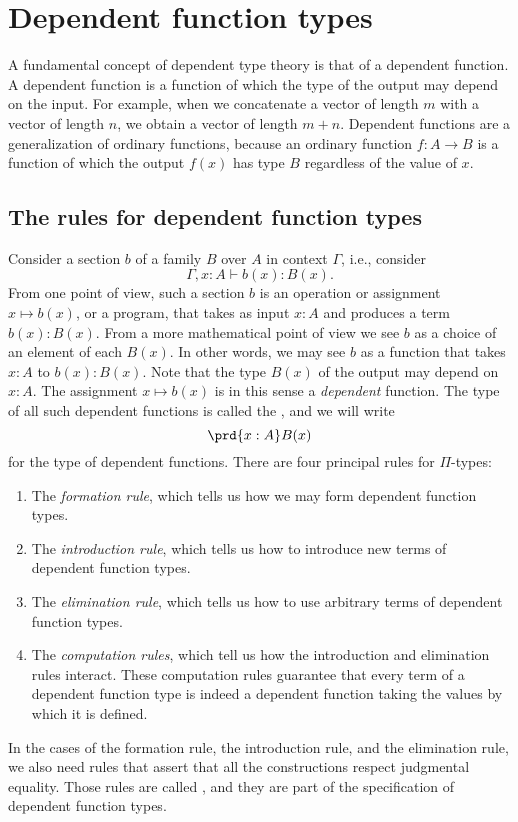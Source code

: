 \section{Dependent function types}
\label{sec:pi}

A fundamental concept of dependent type theory is that of a dependent function. A dependent function is a function of which the type of the output may depend on the input. For example, when we concatenate a vector of length $m$ with a vector of length $n$, we obtain a vector of length $m+n$. Dependent functions are a generalization of ordinary functions, because an ordinary function $f:A\to B$ is a function of which the output $f(x)$ has type $B$ regardless of the value of $x$.

\subsection{The rules for dependent function types}
Consider a section $b$ of a family $B$ over $A$ in context $\Gamma$, i.e., consider
\begin{equation*}
  \Gamma,x:A\vdash b(x):B(x).
\end{equation*}
From one point of view, such a section $b$ is an operation or assignment $x\mapsto b(x)$, or a program, that takes as input $x:A$ and produces a term $b(x):B(x)$. From a more mathematical point of view we see $b$ as a choice of an element of each $B(x)$. In other words, we may see $b$ as a function that takes $x:A$ to $b(x):B(x)$. Note that the type $B(x)$ of the output may depend on $x:A$. The assignment $x\mapsto b(x)$ is in this sense a \emph{dependent} function. The type of all such dependent functions is called the , and we will write
\begin{equation*}
  \prd{x:A}B(x)
\end{equation*}
for the type of dependent functions. There are four principal rules for $\Pi$-types:
\begin{enumerate}
\item The \emph{formation rule}, which tells us how we may form dependent function types.
\item The \emph{introduction rule}, which tells us how to introduce new terms of dependent function types.
\item The \emph{elimination rule}, which tells us how to use arbitrary terms of dependent function types.
\item The \emph{computation rules}, which tell us how the introduction and elimination rules interact. These computation rules guarantee that every term of a dependent function type is indeed a dependent function taking the values by which it is defined.
\end{enumerate}
In the cases of the formation rule, the introduction rule, and the elimination rule, we also need rules that assert that all the constructions respect judgmental equality. Those rules are called , and they are part of the specification of dependent function types.

